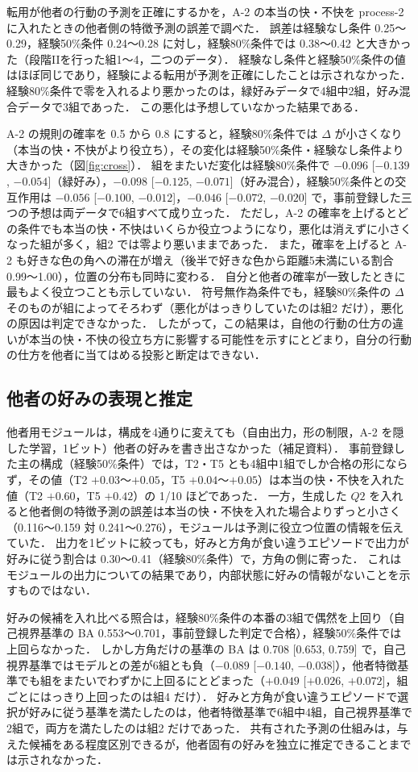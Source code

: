 転用が他者の行動の予測を正確にするかを，A-2 の本当の快・不快を process-2 に入れたときの他者側の特徴予測の誤差で調べた．
誤差は経験なし条件 0.25〜0.29，経験50\%条件 0.24〜0.28 に対し，経験80\%条件では 0.38〜0.42 と大きかった（段階IIを行った組1〜4，二つのデータ）．
経験なし条件と経験50\%条件の値はほぼ同じであり，経験による転用が予測を正確にしたことは示されなかった．
経験80\%条件で零を入れるより悪かったのは，緑好みデータで4組中2組，好み混合データで3組であった．
この悪化は予想していなかった結果である．

A-2 の規則の確率を 0.5 から 0.8 にすると，経験80\%条件では $\Delta$ が小さくなり（本当の快・不快がより役立ち），その変化は経験50\%条件・経験なし条件より大きかった（図\ref{fig:cross}）．
組をまたいだ変化は経験80\%条件で $-0.096$ [$-0.139$, $-0.054$]（緑好み），$-0.098$ [$-0.125$, $-0.071$]（好み混合），経験50\%条件との交互作用は $-0.056$ [$-0.100$, $-0.012$]，$-0.046$ [$-0.072$, $-0.020$] で，事前登録した三つの予想は両データで6組すべて成り立った．
ただし，A-2 の確率を上げるとどの条件でも本当の快・不快はいくらか役立つようになり，悪化は消えずに小さくなった組が多く，組2 では零より悪いままであった．
また，確率を上げると A-2 も好きな色の角への滞在が増え（後半で好きな色から距離5未満にいる割合 0.99〜1.00），位置の分布も同時に変わる．
自分と他者の確率が一致したときに最もよく役立つことも示していない．
符号無作為条件でも，経験80\%条件の $\Delta$ そのものが組によってそろわず（悪化がはっきりしていたのは組2 だけ），悪化の原因は判定できなかった．
したがって，この結果は，自他の行動の仕方の違いが本当の快・不快の役立ち方に影響する可能性を示すにとどまり，自分の行動の仕方を他者に当てはめる投影と断定はできない．

\subsection{他者の好みの表現と推定}\label{sec:res-pref}
他者用モジュールは，構成を4通りに変えても（自由出力，形の制限，A-2 を隠した学習，1ビット）他者の好みを書き出さなかった（補足資料）．
事前登録した主の構成（経験50\%条件）では，T2・T5 とも4組中1組でしか合格の形にならず，その値（T2 $+0.03$〜$+0.05$，T5 $+0.04$〜$+0.05$）は本当の快・不快を入れた値（T2 $+0.60$，T5 $+0.42$）の 1/10 ほどであった．
一方，生成した $Q2$ を入れると他者側の特徴予測の誤差は本当の快・不快を入れた場合よりずっと小さく（0.116〜0.159 対 0.241〜0.276），モジュールは予測に役立つ位置の情報を伝えていた．
出力を1ビットに絞っても，好みと方角が食い違うエピソードで出力が好みに従う割合は 0.30〜0.41（経験80\%条件）で，方角の側に寄った．
これはモジュールの出力についての結果であり，内部状態に好みの情報がないことを示すものではない．

好みの候補を入れ比べる照合は，経験80\%条件の本番の3組で偶然を上回り（自己視界基準の BA 0.553〜0.701，事前登録した判定で合格），経験50\%条件では上回らなかった．
しかし方角だけの基準の BA は 0.708 [0.653, 0.759] で，自己視界基準ではモデルとの差が6組とも負（$-0.089$ [$-0.140$, $-0.038$]），他者特徴基準でも組をまたいでわずかに上回るにとどまった（$+0.049$ [$+0.026$, $+0.072$]，組ごとにはっきり上回ったのは組4 だけ）．
好みと方角が食い違うエピソードで選択が好みに従う基準を満たしたのは，他者特徴基準で6組中4組，自己視界基準で2組で，両方を満たしたのは組2 だけであった．
共有された予測の仕組みは，与えた候補をある程度区別できるが，他者固有の好みを独立に推定できることまでは示されなかった．
